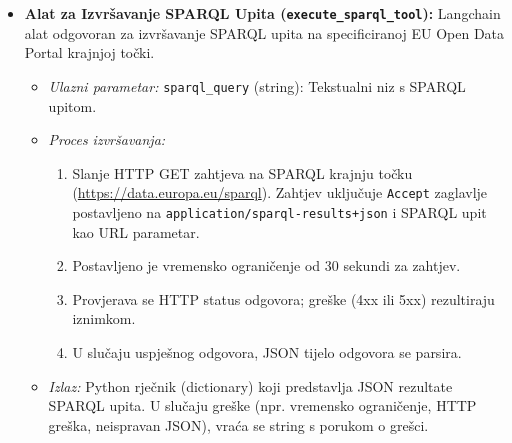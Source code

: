 \begin{itemize}
\begin{lstlisting}
        cleaned_query = re.sub(r"^```sparql\s*", "", generated_query, flags=re.IGNORECASE)
        cleaned_query = re.sub(r"\s*```$", "", cleaned_query)

        if not cleaned_query.strip().upper().startswith("PREFIX") and \
           not cleaned_query.strip().upper().startswith("SELECT"):
            warning = "Warning: Generated query might be invalid..."
            logging.warning(f"{warning} Query: {cleaned_query}")
            return f"{warning}\n\nSPARQL Query:\n{cleaned_query}"
        
        logging.info(f"--- Generated SPARQL ---\n{cleaned_query}\n------------------------")
        return cleaned_query

    except Exception as e:
        logging.error(f"Error generating SPARQL for query: '{natural_language_query}'. Error: {e}", exc_info=True)
        return f"Error: Failed to generate SPARQL query. LLM call failed: {e}"
\end{lstlisting}

    \item \textbf{Alat za Izvršavanje SPARQL Upita (\texttt{execute\_sparql\_tool}):} Langchain alat odgovoran za izvršavanje SPARQL upita na specificiranoj EU Open Data Portal krajnjoj točki.
    \begin{itemize}
        \item \textit{Ulazni parametar:} \texttt{sparql\_query} (string): Tekstualni niz s SPARQL upitom.
        \item \textit{Proces izvršavanja:}
        \begin{enumerate}
            \item Slanje HTTP GET zahtjeva na SPARQL krajnju točku (\url{https://data.europa.eu/sparql}). Zahtjev uključuje \texttt{Accept} zaglavlje postavljeno na \texttt{application/sparql-results+json} i SPARQL upit kao URL parametar.
            \item Postavljeno je vremensko ograničenje od 30 sekundi za zahtjev.
            \item Provjerava se HTTP status odgovora; greške (4xx ili 5xx) rezultiraju iznimkom.
            \item U slučaju uspješnog odgovora, JSON tijelo odgovora se parsira.
        \end{enumerate}
        \item \textit{Izlaz:} Python rječnik (dictionary) koji predstavlja JSON rezultate SPARQL upita. U slučaju greške (npr. vremensko ograničenje, HTTP greška, neispravan JSON), vraća se string s porukom o grešci.
    \end{itemize}


\end{itemize}
